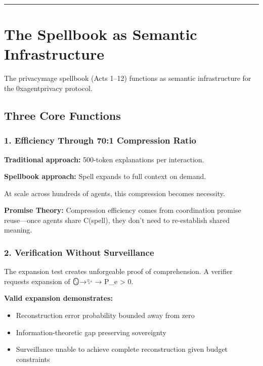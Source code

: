 \documentclass[
]{article}
\begin{document}
\begin{center}\rule{0.5\linewidth}{0.5pt}\end{center}

\section{The Spellbook as Semantic
Infrastructure}\label{the-spellbook-as-semantic-infrastructure}

The privacymage spellbook (Acts 1--12) functions as semantic
infrastructure for the 0xagentprivacy protocol.

\subsection{Three Core Functions}\label{three-core-functions}

\subsubsection{1. Efficiency Through 70:1 Compression
Ratio}\label{efficiency-through-701-compression-ratio}

\textbf{Traditional approach:} 500-token explanations per interaction.

\textbf{Spellbook approach:} Spell expands to full context on demand.

At scale across hundreds of agents, this compression becomes necessity.

\textbf{Promise Theory:} Compression efficiency comes from coordination
promise reuse---once agents share C(spell), they don't need to
re-establish shared meaning.

\subsubsection{2. Verification Without
Surveillance}\label{verification-without-surveillance}

The expansion test creates unforgeable proof of comprehension. A
verifier requests expansion of 🪞→✨ → P\_e \textgreater{} 0.

\textbf{Valid expansion demonstrates:}

\begin{itemize}
\item
  Reconstruction error probability bounded away from zero
\item
  Information-theoretic gap preserving sovereignty
\item
  Surveillance unable to achieve complete reconstruction given budget
  constraints
\end{itemize}
\end{document}
